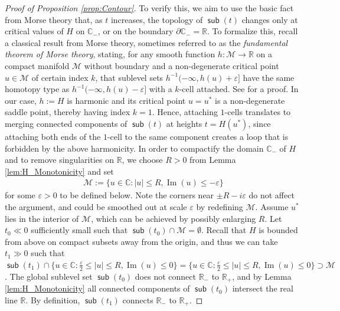 \documentclass[reqno]{amsart}
\DeclareMathOperator{\sub}{\mathsf{sub}}
\newcommand{\1}{\mathbf{1}}
\newcommand{\C}{\mathbb{C}}
\renewcommand\Im{\operatorname{Im}}
\newcommand{\eps}{\varepsilon}
\newcommand{\R}{\mathbb{R}}
\def\R{\mathbb{R}}
\theoremstyle{plain}
\theoremstyle{definition}
\theoremstyle{remark}
\numberwithin{equation}{section}
\begin{document}
\begin{proof}[Proof of Proposition \ref{prop:Contour}]
	To verify this, we aim to use the  basic fact from Morse theory that, as $t$ increases, the topology of $\sub (t)$ changes only at critical values of $H$ on $\C_-$, or on the boundary $\partial\C_-=\R$. To formalize this, recall a classical result from Morse theory, sometimes referred to as the \emph{fundamental theorem of Morse theory}, stating, for any smooth function $ h:\mathcal M\to\R$ on a compact manifold $\mathcal M$ without boundary and a non-degenerate critical point $u\in \mathcal M$ of certain index $k$, that sublevel sets $ h^{-1}(-\infty,  h(u)+\varepsilon]$ have the same homotopy type as $ h^{-1}(-\infty,  h(u)-\varepsilon]$ with a $k$-cell attached. See \cite[Theorem 3.2]{milnor} for a proof. In our case, $h:=H$ is harmonic and its critical point $u=u^*$ is a non-degenerate saddle point, thereby having index $k=1$. Hence, attaching $1$-cells translates to merging connected components of $\sub(t)$ at heights $t=H(u^*)$, since attaching both ends of the $1$-cell to the same component creates a loop that is forbidden by the above harmonicity. In order to compactify the domain $\C_-$ of $H$ and to remove singularities on $\R$, we choose $R>0$ from Lemma \ref{lem:H_Monotonicity} and set
	\begin{align*}
		\mathcal M:= \{u\in\C: |u|\le R, \Im(u)\le -\varepsilon\}
	\end{align*} 
	for some $\varepsilon>0$ to be defined below.
	Note the corners near $\pm R-i\varepsilon$ do not affect the argument, and could be smoothed out at scale $\varepsilon$ by redefining $\mathcal M$. Assume $u^*$ lies in the interior of $\mathcal M$, which can be achieved by possibly enlarging $R$. Let $t_0\ll 0$ sufficiently small such that $\sub(t_0)\cap \mathcal M=\emptyset$.  Recall that $H$ is bounded from above on compact subsets away from the origin, and thus we can take $t_1\gg 0$ such that $\sub(t_1)\cap\{u\in\C: \frac{\eps}{2}\le |u|\le R, \Im(u)\leq0\}=\{u\in\C: \frac{\eps}{2}\le |u|\le R, \Im(u)\leq0\}\supset\mathcal M$. The global sublevel set $\sub(t_0)$ does not connect $\R_-$ to $\R_+$, and by Lemma \ref{lem:H_Monotonicity} all connected components of $\sub(t_0)$ intersect the real line $\R$.  By definition,  $\sub(t_1)$ connects $\R_-$ to $\R_+$.
	

\end{proof}
\end{document}
